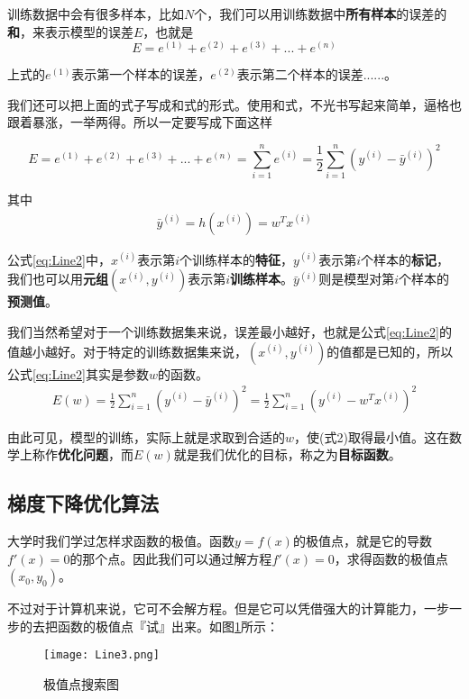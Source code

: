 训练数据中会有很多样本，比如\(N\)个，我们可以用训练数据中\textbf{所有样本}的误差的\textbf{和}，来表示模型的误差\(E\)，也就是
\[
	E=e^{(1)}+e^{(2)}+e^{(3)}+...+e^{(n)}
\]

上式的\(e^{(1)}\)表示第一个样本的误差，\(e^{(2)}\)表示第二个样本的误差......。

我们还可以把上面的式子写成和式的形式。使用和式，不光书写起来简单，逼格也跟着暴涨，一举两得。所以一定要写成下面这样

\begin{equation}
	\label{eq:Line2}
	E = e^{(1)}+e^{(2)}+e^{(3)}+...+e^{(n)}=\sum_{i=1}^{n}e^{(i)} =\frac{1}{2}\sum_{i=1}^{n}(y^{(i)}-\bar{y}^{(i)})^2
\end{equation}


其中
\begin{align*}
	\bar{y}^{(i)} =h(x^{(i)}) = w^T{x^{(i)}}
\end{align*}

公式\ref{eq:Line2}中，\(x^{(i)}\)表示第\(i\)个训练样本的\textbf{特征}，\(y^{(i)}\)表示第\(i\)个样本的\textbf{标记}，我们也可以用\textbf{元组}\((x^{(i)},y^{(i)})\)表示第\(i\)\textbf{训练样本}。\(\bar{y}^{(i)}\)则是模型对第\(i\)个样本的\textbf{预测值}。


我们当然希望对于一个训练数据集来说，误差最小越好，也就是公式\ref{eq:Line2}的值越小越好。对于特定的训练数据集来说，\((x^{(i)},y^{(i)})\)的值都是已知的，所以公式\ref{eq:Line2}其实是参数\({w}\)的函数。
\begin{align*}
	E({w}) =\frac{1}{2}\sum_{i=1}^{n}(y^{(i)}-\bar{y}^{(i)})^2 =\frac{1}{2}\sum_{i=1}^{n}({y^{(i)}-{w}^Tx^{(i)}})^2
\end{align*}


由此可见，模型的训练，实际上就是求取到合适的\({w}\)，使(式2)取得最小值。这在数学上称作\textbf{优化问题}，而\(E({w})\)就是我们优化的目标，称之为\textbf{目标函数}。


\subsection{梯度下降优化算法}\label{Line:5}

大学时我们学过怎样求函数的极值。函数\(y=f(x)\)的极值点，就是它的导数\(f'(x)=0\)的那个点。因此我们可以通过解方程\(f'(x)=0\)，求得函数的极值点\((x_0,y_0)\)。

不过对于计算机来说，它可不会解方程。但是它可以凭借强大的计算能力，一步一步的去把函数的极值点『试』出来。如图\ref{fig:Line3}所示：


\begin{figure}[htbp]
	\centering
	\texttt{[image: Line3.png]}
	\caption{极值点搜索图}
	\label{fig:Line3}
\end{figure}

